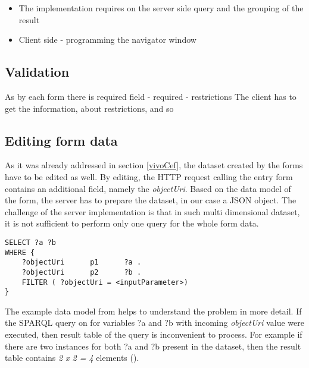 
\begin{itemize}
	\item The implementation requires on the server side query and the grouping of the result
	\item Client side - programming the navigator window
\end{itemize}


\subsection{Validation}

As by each form there is required field - required - restrictions
The client has to get the information, about restrictions, and so  


\subsection{Editing form data}
	
As it was already addressed in section \ref{vivoCef}, the dataset created by the forms have to be edited as well. By editing, the HTTP request calling the entry form contains an additional field, namely the \textit{objectUri}. Based on the data model of the form, the server has to prepare the dataset, in our case a JSON object. The challenge of the server implementation is that in such multi dimensional dataset, it is not sufficient to perform only one query for the whole form data.


\begin{lstlisting}[captionpos=b, caption=SPARQL query for the form data, label={sparqlExisting},
basicstyle=\footnotesize,frame=single]
SELECT ?a ?b
WHERE {
	?objectUri		p1		?a .
	?objectUri		p2		?b .
	FILTER ( ?objectUri = <inputParameter>)
}
\end{lstlisting}

The example data model from  helps to understand the problem in more detail. If the SPARQL query on  for variables ?a and ?b with incoming \textit{objectUri} value were executed, then result table of the query is inconvenient to process. For example if there are two instances for both ?a and ?b present in the dataset, then the result table contains \textit{2 x 2 = 4} elements ().

